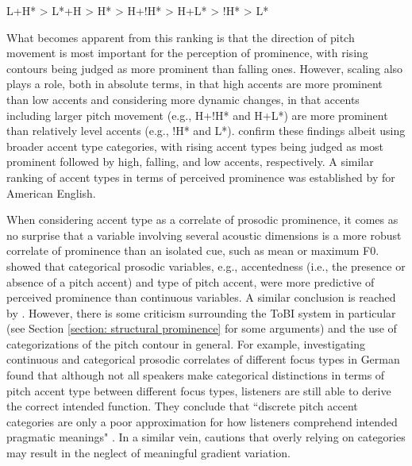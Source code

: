 \hspace*{20mm}L+H* > L*+H > H* > H+!H* > H+L* > !H* > L*

What becomes apparent from this ranking is that the direction of pitch movement is most important for the perception of prominence, with rising contours being judged as more prominent than falling ones. However, scaling also plays a role, both in absolute terms, in that high accents are more prominent than low accents and considering more dynamic changes, in that accents including larger pitch movement (e.g., H+!H* and H+L*) are more prominent than relatively level accents (e.g., !H* and L*). \citet{baumannWhatMakesWord2018} confirm these findings albeit using broader accent type categories, with rising accent types being judged as most prominent followed by high, falling, and low accents, respectively. A similar ranking of accent types in terms of perceived prominence was established by \citet{bishopPhonologyPhoneticsSignalextrinsic2020} for American English.
 
When considering accent type as a correlate of prosodic prominence, it comes as no surprise that a variable involving several acoustic dimensions is a more robust correlate of prominence than an isolated cue, such as mean or maximum F0. \citet{baumannWhatMakesWord2018} showed that categorical prosodic variables, e.g., accentedness (i.e., the presence or absence of a pitch accent) and type of pitch accent, were more predictive of perceived prominence than continuous variables. A similar conclusion is reached by \citet{bishopPhonologyPhoneticsSignalextrinsic2020}. However, there is some criticism surrounding the ToBI system in particular (see Section \ref{section: structural prominence} for some arguments) and the use of categorizations of the pitch contour in general. For example, \citet{griceIntegratingDiscretenessContinuity2017} investigating continuous and categorical prosodic correlates of different focus types in German found that although not all speakers make categorical distinctions in terms of pitch accent type between different focus types, listeners are still able to derive the correct intended function. They conclude that ``discrete pitch accent categories are only a poor approximation for how listeners comprehend intended pragmatic meanings" \citep[101, see Section \ref{section: Information structure} for a more detailed discussion of the prosodic encoding of meaning contrasts]{griceIntegratingDiscretenessContinuity2017}. In a similar vein, \citet{laddTroubleToBI2022} cautions that overly relying on categories may result in the neglect of meaningful gradient variation. 

